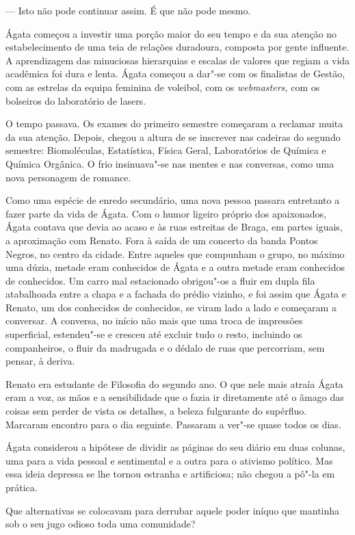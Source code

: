--- Isto não pode continuar assim. É que não pode mesmo.

Ágata começou a investir uma porção maior do seu tempo e da sua atenção
no estabelecimento de uma teia de relações duradoura, composta por gente
influente. A aprendizagem das minuciosas hierarquias e escalas de
valores que regiam a vida acadêmica foi dura e lenta. Ágata começou a
dar"-se com os finalistas de Gestão, com as estrelas da equipa feminina
de voleibol, com os \emph{webmasters, }com os bolseiros do laboratório
de lasers.

O tempo passava. Os exames do primeiro semestre começaram a reclamar
muita da sua atenção. Depois, chegou a altura de se inscrever nas
cadeiras do segundo semestre: Biomoléculas, Estatística, Física Geral,
Laboratórios de Química  e Química Orgânica. O frio insinuava"-se nas
mentes e nas conversas, como uma nova personagem de romance.

Como uma espécie de enredo secundário, uma nova pessoa passara
entretanto a fazer parte da vida de Ágata. Com o humor ligeiro próprio
dos apaixonados, Ágata contava que
devia ao acaso e às ruas estreitas de Braga, em partes iguais, a
aproximação com Renato. Fora à saída de um concerto da banda Pontos
Negros, no centro da cidade. Entre aqueles que compunham o grupo, no
máximo uma dúzia, metade eram conhecidos de Ágata e a outra metade eram
conhecidos de conhecidos. Um carro mal estacionado obrigou"-os a fluir em
dupla fila atabalhoada entre a chapa e a fachada do prédio vizinho, e
foi assim que Ágata e Renato, um dos conhecidos de conhecidos, se viram
lado a lado e começaram a conversar. A conversa, no início não mais que
uma troca de impressões superficial, estendeu"-se e cresceu até excluir
tudo o resto, incluindo os companheiros, o fluir da madrugada e o
dédalo de ruas que percorriam, sem pensar, à deriva.

Renato era estudante de Filosofia do segundo ano. O que nele mais atraía
Ágata eram a voz, as mãos e a sensibilidade que o fazia ir diretamente
até o âmago das coisas sem perder de vista os detalhes, a beleza
fulgurante do supérfluo. Marcaram encontro para o dia seguinte.
Passaram a ver"-se quase todos os dias.

Ágata considerou a hipótese de dividir as páginas do seu diário em duas
colunas, uma para a vida pessoal e sentimental e a outra para o
ativismo político. Mas essa ideia depressa se lhe tornou estranha e
artificiosa; não chegou a pô"-la em prática.

Que alternativas se colocavam para derrubar aquele poder iníquo que
mantinha sob o seu jugo odioso toda uma comunidade?

